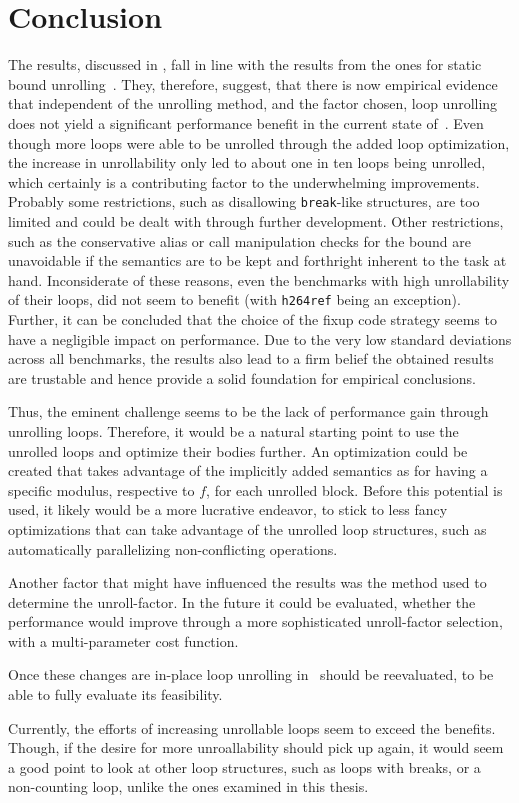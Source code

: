 \chapter{Conclusion}\label{sec:conclusion}

The results, discussed in , fall in line with the results from the ones for static bound unrolling~\cite{aebi18bachelorarbeit}.
They, therefore, suggest, that there is now empirical evidence that independent of the unrolling method, and the factor chosen, loop unrolling does not yield a significant performance benefit in the current state of~\libFIRM.
Even though more loops were able to be unrolled through the added loop optimization, the increase in unrollability only led to about one in ten loops being unrolled, which certainly is a contributing factor to the underwhelming improvements.
Probably some restrictions, such as disallowing \texttt{break}-like structures, are too limited and could be dealt with through further development.
Other restrictions, such as the conservative alias or call manipulation checks for the bound are unavoidable if the semantics are to be kept and forthright inherent to the task at hand.
Inconsiderate of these reasons, even the benchmarks with high unrollability of their loops, did not seem to benefit (with \texttt{h264ref} being an exception).
Further, it can be concluded that the choice of the fixup code strategy seems to have a negligible impact on performance.
Due to the very low standard deviations across all benchmarks, the results also lead to a firm belief the obtained results are trustable and hence provide a solid foundation for empirical conclusions.

Thus, the eminent challenge seems to be the lack of performance gain through unrolling loops.
Therefore, it would be a natural starting point to use the unrolled loops and optimize their bodies further.
An optimization could be created that takes advantage of the implicitly added semantics as for having a specific modulus, respective to $f$, for each unrolled block.
Before this potential is used, it likely would be a more lucrative endeavor, to stick to less fancy optimizations that can take advantage of the unrolled loop structures, such as automatically parallelizing non-conflicting operations.

Another factor that might have influenced the results was the method used to determine the unroll-factor.
In the future it could be evaluated, whether the performance would improve through a more sophisticated unroll-factor selection, with a multi-parameter cost function.

Once these changes are in-place loop unrolling in~\libFIRM{} should be reevaluated, to be able to fully evaluate its feasibility.

Currently, the efforts of increasing unrollable loops seem to exceed the benefits.
Though, if the desire for more unroallability should pick up again, it would seem a good point to look at other loop structures, such as loops with breaks, or a non-counting loop, unlike the ones examined in this thesis.
